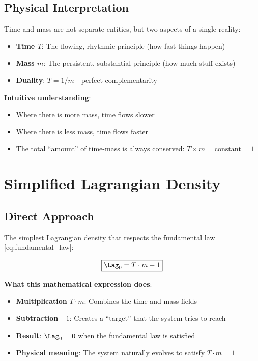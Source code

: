 	\subsection{Physical Interpretation}
	
	\begin{definition}
		Time and mass are not separate entities, but two aspects of a single reality:
		\begin{itemize}
			\item \textbf{Time $T$}: The flowing, rhythmic principle (how fast things happen)
			\item \textbf{Mass $m$}: The persistent, substantial principle (how much stuff exists)
			\item \textbf{Duality}: $T = 1/m$ - perfect complementarity
		\end{itemize}
	\end{definition}
	
	\textbf{Intuitive understanding}: 
	\begin{itemize}
		\item Where there is more mass, time flows slower
		\item Where there is less mass, time flows faster  
		\item The total ``amount'' of time-mass is always conserved: $T \times m = \text{constant} = 1$
	\end{itemize}
	
	\section{Simplified Lagrangian Density}
	
	\subsection{Direct Approach}
	
	The simplest Lagrangian density that respects the fundamental law \eqref{eq:fundamental_law}:
	
	\begin{equation}
		\boxed{\Lag_0 = T \cdot m - 1}
		\label{eq:simple_lagrangian}
	\end{equation}
	
	\textbf{What this mathematical expression does}:
	\begin{itemize}
		\item \textbf{Multiplication} $T \cdot m$: Combines the time and mass fields
		\item \textbf{Subtraction} $-1$: Creates a ``target'' that the system tries to reach
		\item \textbf{Result}: $\Lag_0 = 0$ when the fundamental law is satisfied
		\item \textbf{Physical meaning}: The system naturally evolves to satisfy $T \cdot m = 1$
	\end{itemize}
	
